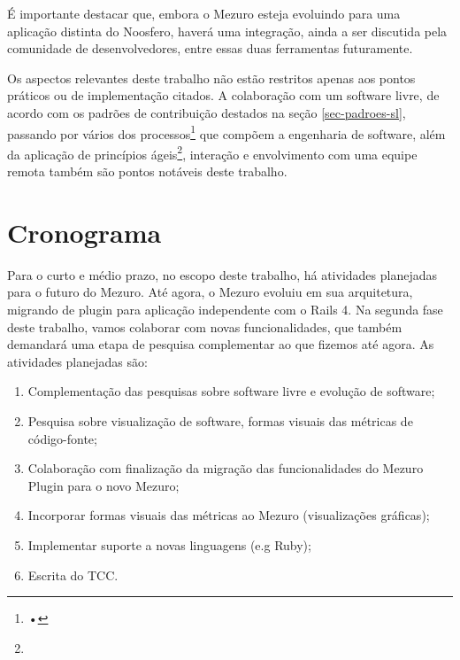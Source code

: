 É importante destacar que, embora o Mezuro esteja evoluindo para uma aplicação distinta do Noosfero, haverá uma integração, ainda a ser discutida pela comunidade de desenvolvedores, entre essas duas ferramentas futuramente.

Os aspectos relevantes deste trabalho não estão restritos apenas aos  pontos práticos ou de implementação citados. A colaboração com um software livre, de acordo com os padrões de contribuição destados na seção \ref{sec-padroes-sl}, passando por vários dos processos\footnote{•} que compõem a engenharia de software, além da aplicação de princípios ágeis\footnote{}, interação e envolvimento com uma equipe remota também são pontos notáveis deste trabalho.


\section{Cronograma}

Para o curto e médio prazo, no escopo deste trabalho, há atividades planejadas para o futuro do Mezuro. Até agora, o Mezuro evoluiu em sua arquitetura, migrando de plugin para aplicação independente com o Rails 4. Na segunda fase deste trabalho, vamos colaborar com novas funcionalidades, que também demandará uma etapa de pesquisa complementar ao que fizemos até agora. As atividades planejadas são:

\begin{enumerate}
\item Complementação das pesquisas sobre software livre e evolução de software;
\item Pesquisa sobre visualização de software, formas visuais das métricas de código-fonte;
\item Colaboração com finalização da migração das funcionalidades do Mezuro Plugin para o novo Mezuro;
\item Incorporar formas visuais das métricas ao Mezuro (visualizações gráficas);
\item Implementar suporte a novas linguagens (e.g Ruby);
\item Escrita do TCC.
\end{enumerate}

